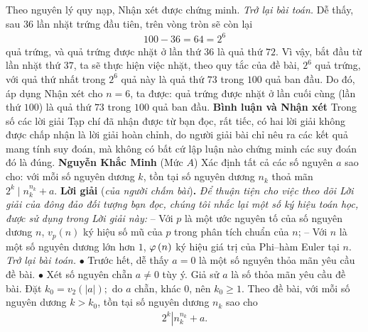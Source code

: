 \begin{multicols}{2}
	\vskip 0.05cm
	Theo nguyên lý quy nạp, Nhận xét được chứng minh.
	\vskip 0.05cm
	\textit{Trở lại bài toán.}
	\vskip 0.05cm
	Dễ thấy, sau $36$ lần nhặt trứng đầu tiên, trên vòng tròn sẽ còn lại
	\begin{align*}
		100 - 36 = 64 = {2^6}
	\end{align*}
	quả trứng, và quả trứng được nhặt ở lần thứ $36$ là quả thứ $ 72$.
	\vskip 0.05cm
	Vì vậy, bắt đầu từ lần nhặt thứ $37$, ta sẽ thực hiện việc nhặt, theo quy tắc của đề bài, $2^6$  quả trứng, với quả thứ nhất trong $2^6$  quả này là quả thứ $73$ trong $100$ quả ban đầu. Do đó, áp dụng Nhận xét cho $n = 6$, ta được: quả trứng được nhặt ở lần cuối cùng (lần thứ $100$) là quả thứ $73$ trong $100$ quả ban đầu.
	\vskip 0.05cm
	\textbf{\color{thachthuctoanhoc}Bình luận và Nhận xét}
	\vskip 0.05cm
	Trong số các lời giải Tạp chí đã nhận được từ bạn đọc, rất tiếc, có hai lời giải không được chấp nhận là lời giải hoàn chỉnh, do người giải bài chỉ nêu ra các kết quả mang tính suy đoán, mà không có bất cứ lập luận nào chứng minh các suy đoán đó là đúng.
	\vskip 0.15cm
	\hfill\textbf{\color{thachthuctoanhoc}Nguyễn Khắc Minh}
	\vskip 0.05cm
	{}
	(Mức $A$) Xác định tất cả các số nguyên $a$ sao cho: với mỗi số nguyên dương $k$, tồn tại số nguyên dương $n_k$ thoả mãn $2^k\mid n_k^{n_k}+a$. 
	\vskip 0.05cm
	\textbf{\color{thachthuctoanhoc}Lời giải} (\textit{của người chấm bài})\textbf{\color{thachthuctoanhoc}.}
	\vskip 0.05cm
	\textit{Để thuận tiện cho việc theo dõi Lời giải của đông đảo đối tượng bạn đọc, chúng tôi nhắc lại một số ký hiệu toán học, được sử dụng trong Lời giải này:}
	\vskip 0.05cm
	-- Với $p$ là một ước nguyên tố của số nguyên dương $n$, ${v_p}\left( n \right)$ ký hiệu số mũ của $p$ trong phân tích chuẩn của $n$;
	\vskip 0.05cm
	-- Với $n$ là một số nguyên dương lớn hơn $1$,  ${\rm{\varphi }}\left( n \right)$ ký hiệu giá trị của Phi--hàm Euler tại $n$.
	\vskip 0.05cm
	\textit{Trở lại bài toán.}
	\vskip 0.05cm
	$\bullet$ Trước hết, dễ thấy $a = 0$ là một số nguyên thỏa mãn yêu cầu đề bài.
	\vskip 0.05cm
	$\bullet$ Xét số nguyên chẵn $a \ne  0$ tùy ý.
	\vskip 0.05cm
	Giả sử $a$ là số thỏa mãn yêu cầu đề bài.
	\vskip 0.05cm
	Đặt ${k_0} = {v_2}\left( {|a|} \right);$  do $a$ chẵn, khác $0$, nên $k_0 \ge 1$.
	\vskip 0.05cm  
	Theo đề bài, với mỗi số nguyên dương \linebreak$k > k_0$,  tồn tại số nguyên dương $n_k$   sao cho
	\begin{align*}
		{2^k}\left| {n_k^{{n_k}} + a} \right.. \tag{$1$}
	\end{align*}

\end{multicols}
